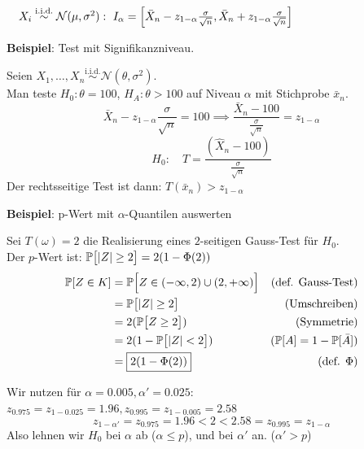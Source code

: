 {\footnotesize
    \remark $\quad X_i \overset{\text{i.i.d.}}{\sim}\mathcal{N}(\mu,\sigma^2):\ I_\alpha = \Bigl[\bar{X}_n - z_{1-\alpha}\frac{\sigma}{\sqrt{n}}, \bar{X}_n + z_{1-\alpha}\frac{\sigma}{\sqrt{n}}\Bigr]$
}

{\scriptsize
    \textbf{Beispiel}: Test mit Signifikanzniveau.

    Seien $X_1,\ldots,X_n \overset{\text{i.i.d.}}{\sim} \mathcal{N}(\theta, \sigma^2)$.\\
    Man teste $H_0: \theta = 100$, $H_A: \theta > 100$ auf Niveau $\alpha$ mit Stichprobe $\bar{x}_n$.\\
    $$
        \bar{X}_n - z_{1-\alpha}\frac{\sigma}{\sqrt{n}} = 100 \implies
        \frac{\bar{X}_n - 100}{\frac{\sigma}{\sqrt{n}}} = z_{1-\alpha}
    $$
    $$
        \boxed{H_0:\quad T = \frac{(\hat{X}_n - 100)}{\frac{\sigma}{\sqrt{n}}}}
    $$
    Der rechtsseitige Test ist dann: $T(\bar{x}_n) > z_{1-\alpha}$
}

{\scriptsize
    \textbf{Beispiel}: p-Wert mit $\alpha$-Quantilen auswerten

    Sei $T(\omega)=2$ die Realisierung eines $2$-seitigen Gauss-Test für $H_0$.\\
    Der $p$-Wert ist: $\P\bigl[|Z|\geq 2\bigr] = 2(1-\Phi(2))$
    \begin{align*}
        \P[Z \in K] &= \P\Bigl[Z \in (-\infty, 2)\cup(2,+\infty)\Bigr]  & (\text{def. Gauss-Test})          \\
                    &= \P\bigl[|Z|\geq 2 \bigr]                         & (\text{Umschreiben})              \\
                    &= 2(\P\bigl[Z \geq 2 \bigr])                       & (\text{Symmetrie})                \\
                    &= 2(1-\P\bigl[|Z| < 2 \bigr])                      & (\P[A] = 1-\P[\bar{A}])    \\
                    &= \boxed{2(1-\Phi(2))}                             & (\text{def. } \Phi)
    \end{align*}


    Wir nutzen für $\alpha=0.005, \alpha'=0.025$:\\
    $z_{0.975} = z_{1-0.025} =1.96, z_{0.995} = z_{1-0.005} = 2.58$
    $$
        z_{1-\alpha'} = z_{0.975} = 1.96 < 2 < 2.58 = z_{0.995} = z_{1-\alpha}
    $$
    Also lehnen wir $H_0$ bei $\alpha$ ab ($\alpha \leq p$), und bei $\alpha'$ an. ($\alpha' > p$)

}
